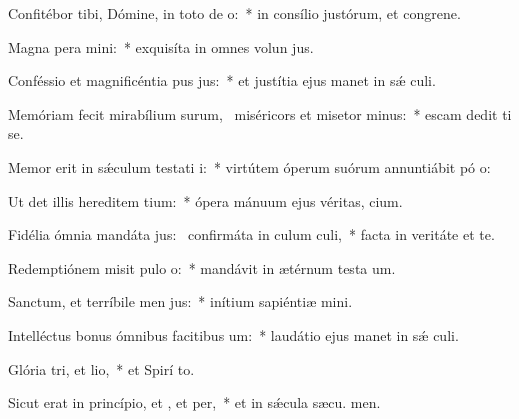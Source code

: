 \item Confitébor tibi, Dómine, in toto de o:~* in consílio justórum, et congrene.
\item Magna pera mini:~* exquisíta in omnes volun jus.
\item Conféssio et magnificéntia pus jus:~* et justítia ejus manet in sǽ culi.
\item Memóriam fecit mirabílium surum,~\pscross{} miséricors et misetor minus:~* escam dedit ti se.
\item Memor erit in sǽculum testati i:~* virtútem óperum suórum annuntiábit pó o:
\item Ut det illis hereditem tium:~* ópera mánuum ejus véritas,  cium.
\item Fidélia ómnia mandáta jus:~\pscross{} confirmáta in culum culi,~* facta in veritáte et te.
\item Redemptiónem misit pulo o:~* mandávit in ætérnum testa um.
\item Sanctum, et terríbile men jus:~* inítium sapiéntiæ  mini.
\item Intelléctus bonus ómnibus facitibus um:~* laudátio ejus manet in sǽ culi.
\item Glória tri, et lio,~* et Spirí to.
\item Sicut erat in princípio, et , et per,~* et in sǽcula sæcu. men.
